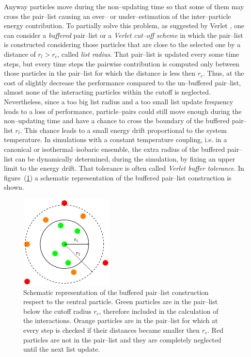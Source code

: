 Anyway particles move during the non--updating time so that some of them may cross the pair--list causing an
over-- or under--estimation of the inter--particle energy contribution. To partially solve this problem, as
suggested by Verlet \cite{VerletList}, one can consider a \textit{buffered} pair--list or a \textit{Verlet
cut--off scheme} in which the pair--list is constructed considering those particles that are close to the
selected one by a distance of $r_l > r_c$, called \textit{list radius}. That pair--list is updated every some
time steps, but every time steps the pairwise contribution is computed only between those particles in the
pair--list for which the distance is less then $r_c$. Thus, at the cost of slightly decrease the performance
compared to the un--buffered pair--list, almost none of the interacting particles within the cutoff is neglected.
Nevertheless, since a too big list radius and a too small list update frequency leads to a loss of performance,
particle--pairs could still move enough during the non--updating time and have a chance to cross the boundary of
the buffered pair--list $r_l$. This chance leads to a small energy drift proportional to the system temperature.
In simulations with a constant temperature coupling, i.e. in a canonical or isothermal--isobaric ensemble, the
extra radius of the buffered pair--list can be dynamically determined, during the simulation, by fixing an upper
limit to the energy drift. That tolerance is often called \textit{Verlet buffer tolerance}. In
figure~(\ref{fig:pairlist}) a schematic representation of the buffered pair--list construction is shown.
\begin{figure}
	\includegraphics[width=0.42\textwidth]{./img/pairList/pairList}
	\caption{Schematic representation of the buffered pair--list construction respect to the central particle.
	Green particles are in the pair--list below the cutoff radius $r_c$, therefore included in the calculation of the interactions. Orange particles are in the pair--list for which at every step is checked if their distances became smaller then $r_c$. Red particles are not in the pair--list and they are completely neglected until the next list update.}
	\label{fig:pairlist}
\end{figure}

